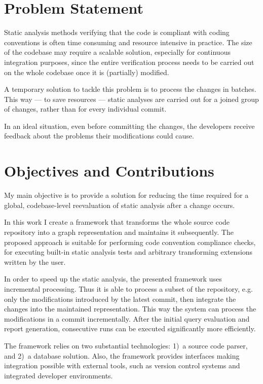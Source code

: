 \section{Problem Statement}

Static analysis methods verifying that the code is compliant with coding conventions is often time consuming and resource intensive in practice. The size of the codebase may require a scalable solution, especially for continuous integration purposes, since the entire verification process needs to be carried out on the whole codebase once it is (partially) modified.

A temporary solution to tackle this problem is to process the changes in batches. This way --- to save resources --- static analyses are carried out for a joined group of changes, rather than for every individual commit.

In an ideal situation, even before committing the changes, the developers receive feedback about the problems their modifications could cause.


\section{Objectives and Contributions}

My main objective is to provide a solution for reducing the time required for a global, codebase-level reevaluation of static analysis after a change occurs.

In this work I create a framework that transforms the whole source code repository into a graph representation and maintains it subsequently. The proposed approach is suitable for performing code convention compliance checks, for executing built-in static analysis tests and arbitrary transforming extensions written by the user.

In order to speed up the static analysis, the presented framework uses incremental processing. Thus it is able to process a subset of the repository, e.g. only the modifications introduced by the latest commit, then integrate the changes into the maintained representation. This way the system can process the modifications in a commit incrementally. After the initial query evaluation and report generation, consecutive runs can be executed significantly more efficiently.

The framework relies on two substantial technologies: 1)~a source code parser, and 2)~a database solution. Also, the framework provides interfaces making integration possible with external tools, such as version control systems and integrated developer environments.


